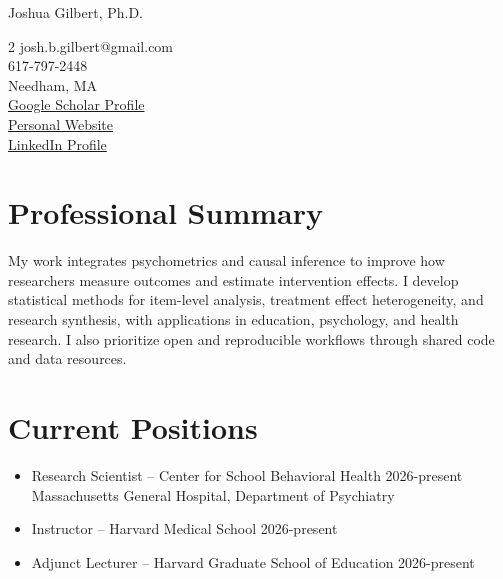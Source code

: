\documentclass[11pt]{article}
\begin{document}
\begin{center}
{\LARGE Joshua Gilbert, Ph.D.}\\
\begin{multicols}{2}
josh.b.gilbert@gmail.com \\
617-797-2448 \\
Needham, MA \\
\columnbreak
\href{https://scholar.google.com/citations?user=OCdG4IgAAAAJ&hl=en}{Google Scholar Profile} \\
\href{https://joshgilbert1994.github.io/cv-website/}{Personal Website} \\
\href{https://www.linkedin.com/in/josh-b-gilbert/}{LinkedIn Profile}
\end{multicols}
\end{center}

\section{Professional Summary}



My work integrates psychometrics and causal inference to improve how researchers measure outcomes and estimate intervention effects. I develop statistical methods for item-level analysis, treatment effect heterogeneity, and research synthesis, with applications in education, psychology, and health research. I also prioritize open and reproducible workflows through shared code and data resources.

\section{Current Positions}
\begin{itemize}
    \item Research Scientist -- Center for School Behavioral Health \hfill 2026-present \\
Massachusetts General Hospital, Department of Psychiatry
\item Instructor -- Harvard Medical School \hfill 2026-present
  \item Adjunct Lecturer -- Harvard Graduate School of Education \hfill 2026-present
 \end{itemize}
\end{document}
